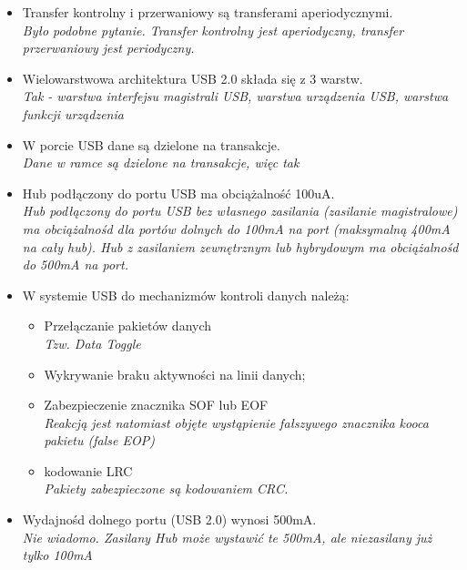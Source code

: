 \begin{itemize}
	\item \textcolor{nie}{Transfer kontrolny i przerwaniowy są transferami aperiodycznymi.} \\
	{\small \emph{Było podobne pytanie. Transfer kontrolny jest aperiodyczny, transfer przerwaniowy jest periodyczny.}}
	
	\item \textcolor{tak}{Wielowarstwowa architektura USB 2.0 składa się z 3 warstw.} \\
	{\small \emph{Tak - warstwa interfejsu magistrali USB, warstwa urządzenia USB, warstwa funkcji urządzenia}}
	
	\item \textcolor{tak}{W porcie USB dane są dzielone na transakcje.} \\
	{\small \emph{Dane w ramce są dzielone na transakcje, więc tak}}
	
	\item \textcolor{nie}{Hub podłączony do portu USB ma obciążalność 100uA.} \\
	{\small \emph{Hub podłączony do portu USB bez własnego zasilania (zasilanie magistralowe) ma obciążalnośd dla portów dolnych do 100mA na port (maksymalną 400mA na cały hub). Hub z zasilaniem zewnętrznym lub hybrydowym ma obciążalnośd do 500mA na port.}}
	
	\item {W systemie USB do mechanizmów kontroli danych należą:}
	\begin{itemize}
		\item \textcolor{tak}{Przełączanie pakietów danych} \\
		{\small \emph{Tzw. Data Toggle}}
		
		\item \textcolor{tak}{Wykrywanie braku aktywności na linii danych;}
		
		\item \textcolor{nie}{Zabezpieczenie znacznika SOF lub EOF} \\
		{\small \emph{Reakcją jest natomiast objęte wystąpienie fałszywego znacznika kooca pakietu (false EOP)}}
		
		\item \textcolor{nie}{kodowanie LRC} \\
		{\small \emph{Pakiety zabezpieczone są kodowaniem CRC.}}
	\end{itemize}
	
	\item \textcolor{nie}{Wydajnośd dolnego portu (USB 2.0) wynosi 500mA.} \\
	{\small \emph{Nie wiadomo. Zasilany Hub może wystawić te 500mA, ale niezasilany już tylko 100mA}}
	

\end{itemize}
